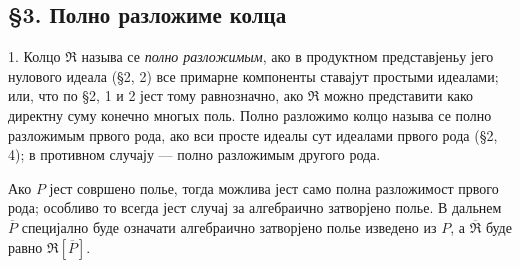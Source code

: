 \documentclass[11pt]{article}
\begin{document}
\setcounter{footnote}{22}

\subsection*{\S 3. Полно разложиме колца}

1. Колцо $\mathfrak R$ называ се \emph{полно разложимым}, ако в продуктном представјеньу јего нулового идеала (§2, 2) все примарне компоненты ставајут простыми идеалами; или, что по §2, 1 и 2 јест тому равнозначно, ако $\mathfrak R$ можно представити како директну суму конечно многых поль. Полно разложимо колцо называ се полно разложимым првого рода, ако вси просте идеалы сут идеалами првого рода (§2, 4); в противном случају --- полно разложимым другого рода.

Ако $P$ јест совршено полье, тогда можлива јест само полна разложимост првого рода; особливо то всегда јест случај за алгебраично затворјено полье. В дальнем $\overline P$ специјално буде означати алгебраично затворјено полье изведено из $P$, а $\overline{\mathfrak R}$ буде равно $\mathfrak R[\overline P]$.
\end{document}
